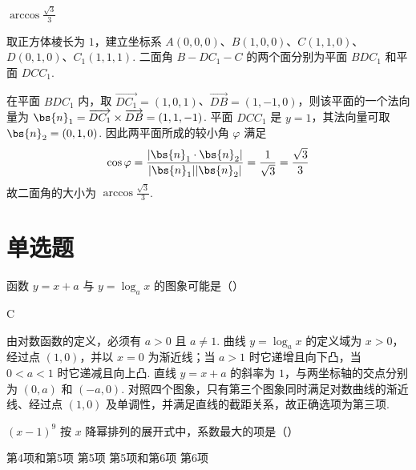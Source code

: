 \begin{answer}
\(\arccos \frac{\sqrt{3}}{3}\)
\end{answer}

\begin{solution}
取正方体棱长为 \(1\)，建立坐标系
\(A(0,0,0)\)、\(B(1,0,0)\)、\(C(1,1,0)\)、\(D(0,1,0)\)、\(C_1(1,1,1)\). 二面角 \(B-DC_1-C\) 的两个面分别为平面 \(BDC_1\) 和平面 \(DCC_1\).

在平面 \(BDC_1\) 内，取
\(\overrightarrow{DC_1}=(1,0,1)\)、\(\overrightarrow{DB}=(1,-1,0)\)，则该平面的一个法向量为
\(\bs{n}_1=\overrightarrow{DC_1}\times\overrightarrow{DB}=(1,1,-1)\). 平面 \(DCC_1\) 是 \(y=1\)，其法向量可取 \(\bs{n}_2=(0,1,0)\). 因此两平面所成的较小角 \(\varphi\) 满足
\[
\cos\varphi=\frac{|\bs{n}_1\cdot\bs{n}_2|}{|\bs{n}_1||\bs{n}_2|}=\frac{1}{\sqrt{3}}=\frac{\sqrt{3}}{3}
\]
故二面角的大小为 \(\arccos\frac{\sqrt{3}}{3}\).
\end{solution}

\section{单选题}

\begin{problem}
函数 \(y = x + a\) 与 \(y = \log_a x\) 的图象可能是（\quad）

    {}
    {}
    {}
\end{problem}

\begin{answer}
C
\end{answer}

\begin{solution}
由对数函数的定义，必须有 \(a>0\) 且 \(a\neq 1\). 曲线 \(y=\log_a x\) 的定义域为 \(x>0\)，经过点 \((1,0)\)，并以 \(x=0\) 为渐近线；当 \(a>1\) 时它递增且向下凸，当 \(0<a<1\) 时它递减且向上凸. 直线 \(y=x+a\) 的斜率为 \(1\)，与两坐标轴的交点分别为 \((0,a)\) 和 \((-a,0)\). 对照四个图象，只有第三个图象同时满足对数曲线的渐近线、经过点 \((1,0)\) 及单调性，并满足直线的截距关系，故正确选项为第三项.
\end{solution}

\begin{problem}
\((x - 1)^{9}\) 按 \(x\) 降幂排列的展开式中，系数最大的项是（\quad）

\choices
    {第4项和第5项}
    {第5项}
    {第5项和第6项}
    {第6项}
\end{problem}

